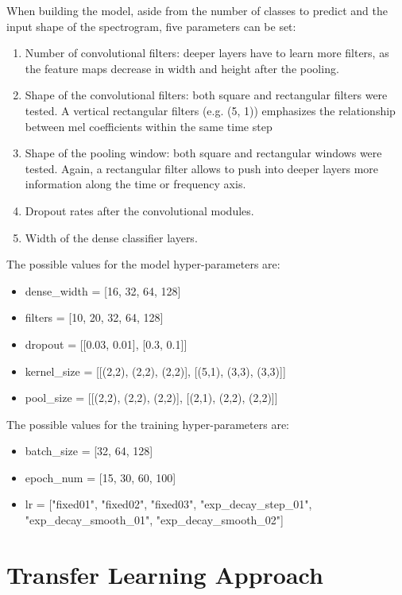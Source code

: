 When building the model, aside from the number of classes to predict and the
input shape of the spectrogram, five parameters can be set:
\begin{enumerate}
    \item Number of convolutional filters: deeper layers have to learn more
        filters, as the feature maps decrease in width and height after the
        pooling.
    \item Shape of the convolutional filters:
        both square and rectangular filters were tested.
        A vertical rectangular filters (e.g. (5, 1)) emphasizes the
        relationship between mel coefficients within the same time step
    \item Shape of the pooling window: 
        both square and rectangular windows were tested.
        Again, a rectangular filter allows to push into deeper layers more
        information along the time or frequency axis.
    \item Dropout rates after the convolutional modules.
    \item Width of the dense classifier layers.
\end{enumerate}
The possible values for the model hyper-parameters are:
\begin{itemize}
    \item dense\_width = [16, 32, 64, 128]
    \item filters = [10, 20, 32, 64, 128]
    \item dropout = [[0.03, 0.01],  [0.3, 0.1]]
    \item kernel\_size = [[(2,2), (2,2), (2,2)], [(5,1), (3,3), (3,3)]]
    \item pool\_size = [[(2,2), (2,2), (2,2)], [(2,1), (2,2), (2,2)]]
\end{itemize}
The possible values for the training hyper-parameters are:
\begin{itemize}
    \item batch\_size = [32, 64, 128]
    \item epoch\_num = [15, 30, 60, 100]
    \item lr = ["fixed01", "fixed02", "fixed03",
        "exp\_decay\_step\_01", "exp\_decay\_smooth\_01",
    "exp\_decay\_smooth\_02"]
\end{itemize}

\section{Transfer Learning Approach}
\label{sec:transfer_learning}

